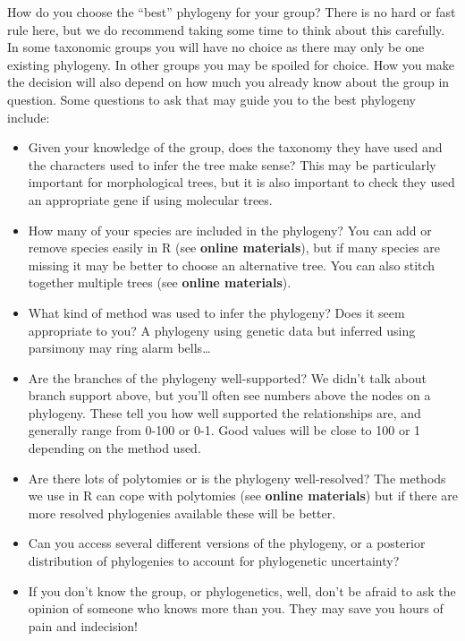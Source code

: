 \documentclass[]{book}
\providecommand{\tightlist}{%
  \setlength{\itemsep}{0pt}\setlength{\parskip}{0pt}}
\begin{document}
How do you choose the ``best'' phylogeny for your group? There is no
hard or fast rule here, but we do recommend taking some time to think
about this carefully. In some taxonomic groups you will have no choice
as there may only be one existing phylogeny. In other groups you may be
spoiled for choice. How you make the decision will also depend on how
much you already know about the group in question. Some questions to ask
that may guide you to the best phylogeny include:

\begin{itemize}
\tightlist
\item
  Given your knowledge of the group, does the taxonomy they have used
  and the characters used to infer the tree make sense? This may be
  particularly important for morphological trees, but it is also
  important to check they used an appropriate gene if using molecular
  trees.
\item
  How many of your species are included in the phylogeny? You can add or
  remove species easily in R (see \textbf{online materials}), but if
  many species are missing it may be better to choose an alternative
  tree. You can also stitch together multiple trees (see \textbf{online
  materials}).
\item
  What kind of method was used to infer the phylogeny? Does it seem
  appropriate to you? A phylogeny using genetic data but inferred using
  parsimony may ring alarm bells\ldots{}
\item
  Are the branches of the phylogeny well-supported? We didn't talk about
  branch support above, but you'll often see numbers above the nodes on
  a phylogeny. These tell you how well supported the relationships are,
  and generally range from 0-100 or 0-1. Good values will be close to
  100 or 1 depending on the method used.
\item
  Are there lots of polytomies or is the phylogeny well-resolved? The
  methods we use in R can cope with polytomies (see \textbf{online
  materials}) but if there are more resolved phylogenies available these
  will be better.
\item
  Can you access several different versions of the phylogeny, or a
  posterior distribution of phylogenies to account for phylogenetic
  uncertainty?
\item
  If you don't know the group, or phylogenetics, well, don't be afraid
  to ask the opinion of someone who knows more than you. They may save
  you hours of pain and indecision!
\end{itemize}
\end{document}

